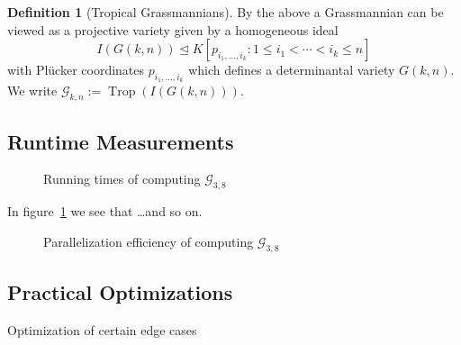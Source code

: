 \documentclass[
  paper=a4,
  titlepage,
  bibliography=totoc,
  listof=totoc,
  pagesize=pdftex
]{scrartcl}
\numberwithin{figure}{section}
\numberwithin{equation}{section}
\numberwithin{table}{section}
\let\idealof\trianglelefteq
\DeclareMathOperator{\Trop}{Trop}
\theoremstyle{definition}
\newtheorem{definition}{Definition}
\numberwithin{definition}{section}
\begin{document}
\begin{definition}[Tropical Grassmannians]
  By the above a Grassmannian can be viewed as a projective variety given by a homogeneous
  ideal
  \[
    I(G(k,n)) \idealof K[ p_{i_1, \dots, i_k} : 1\leq i_1 < \cdots < i_k \leq n ]
  \]
  with Plücker coordinates $p_{i_1,\dots,i_k}$ which defines a determinantal variety $G(k,
  n)$. We write $\mathcal G_{k,n} := \Trop(I(G(k,n)))$.
\end{definition}

\subsection{Runtime Measurements}

\begin{figure}[htbp]
  \begin{center}
    
  \end{center}
  \caption{Running times of computing $\mathcal{G}_{3,8}$}
  \label{fig:g38scaling}
\end{figure}

In figure~\ref{fig:g38scaling} we see that \dots and so on.

\begin{figure}[htbp]
  \begin{center}
    
  \end{center}
  \caption{Parallelization efficiency of computing $\mathcal{G}_{3,8}$}
  \label{fig:g38efficiency}
\end{figure}

\subsection{Practical Optimizations}

Optimization of certain edge cases

\newpage
\listoffigures
\newpage%
\printbibliography
\end{document}

